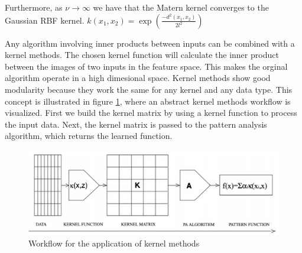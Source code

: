 Furthermore, as $\nu \to \infty$ we have that the Matern kernel converges to the Gaussian RBF kernel.
$k(x_1,x_2)=\exp\left(\frac{-d^2(x_1,x_2)}{2l^2}\right)$




Any algorithm involving inner products between inputs can be combined with a kernel methods. The chosen kernel function will calculate the inner product between the images of two inputs in the feature space. This makes the orginal algorithm operate in a high dimesional space. Kernel methods show good modularity because they work the same for any kernel and any data type. This concept is illustrated in figure \ref{fig:workflow_kernels}, where an abstract kernel methods workflow is visualized. First we build the kernel matrix by using a kernel function to process the input data. Next, the kernel matrix is passed to the pattern analysis algorithm, which returns the learned function.

\begin{figure}[!ht]
    \includegraphics[width=\textwidth]{images/workflow_kernels.png}
    \caption{Workflow for the application of kernel methods \cite{shawe2004kernel}}
    \label{fig:workflow_kernels}
\end{figure}
